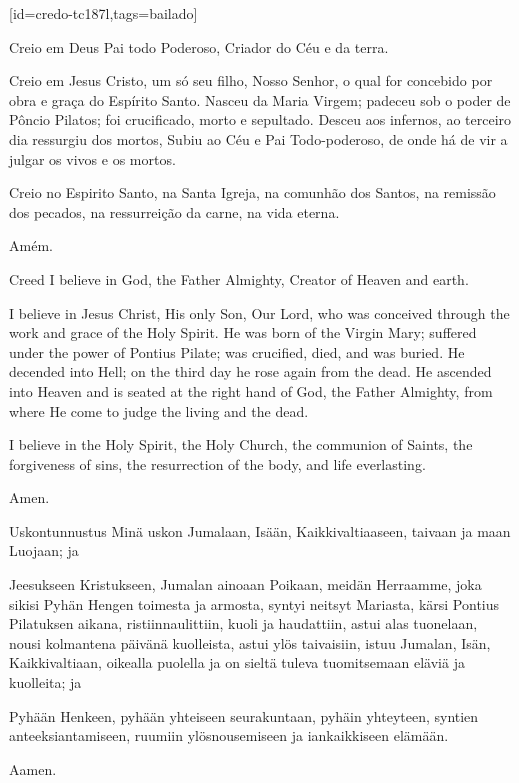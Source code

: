 \scleardpage
{}[id={credo-tc187l},tags={bailado}]
  \begin{passage}[PT]{}
    Creio em Deus Pai todo Poderoso,
    Criador do Céu e da terra.
    \par
    Creio em Jesus Cristo, um só seu filho, Nosso
    Senhor, o qual for concebido por obra e graça do
    Espírito Santo. Nasceu da Maria Virgem;
    padeceu sob o poder de Pôncio Pilatos;
    foi crucificado, morto e sepultado. Desceu aos
    infernos, ao terceiro dia ressurgiu dos mortos,
    Subiu ao Céu e Pai Todo-poderoso, de onde há de vir
    a julgar os vivos e os mortos.
    \par
    Creio no Espirito Santo, na Santa Igreja,
    na comunhão dos Santos, na remissão
    dos pecados, na ressurreição da carne,
    na vida eterna.
    \par
    Amém.
  \end{passage}
  \hardbrk
  \begin{passage}[EN]{Creed}
    I believe in God, the Father Almighty,
    Creator of Heaven and earth.
    \par
    I believe in Jesus Christ, His only Son, Our Lord,
    who was conceived through the work and grace of
    the Holy Spirit. He was born of the Virgin Mary;
    suffered under the power of Pontius Pilate;
    was crucified, died, and was buried. He decended
    into Hell; on the third day he rose again from
    the dead. He ascended into Heaven and is seated
    at the right hand of God, the Father Almighty, from
    where He come to judge the living and the dead.
    \par
    I believe in the Holy Spirit, the Holy Church,
    the communion of Saints, the forgiveness of sins,
    the resurrection of the body, and life everlasting.
    \par
    Amen.
  \end{passage}
  \begin{passage}[FI]{Uskontunnustus}
    Minä uskon Jumalaan, Isään, Kaikkivaltiaaseen, taivaan ja maan Luojaan; ja
    \par
    Jeesukseen Kristukseen, Jumalan ainoaan Poikaan, meidän Herraamme,
    joka sikisi Pyhän Hengen toimesta ja armosta, syntyi neitsyt Mariasta,
    kärsi Pontius Pilatuksen aikana, ristiinnaulittiin, kuoli ja haudattiin,
    astui alas tuonelaan, nousi kolmantena päivänä kuolleista, astui ylös
    taivaisiin, istuu Jumalan, Isän, Kaikkivaltiaan, oikealla puolella ja on
    sieltä tuleva tuomitsemaan eläviä ja kuolleita; ja
    \par
    Pyhään Henkeen, pyhään yhteiseen seurakuntaan, pyhäin yhteyteen, syntien
    anteeksiantamiseen, ruumiin ylösnousemiseen ja iankaikkiseen elämään.
    \par
    Aamen.
  \end{passage}
\endsong


